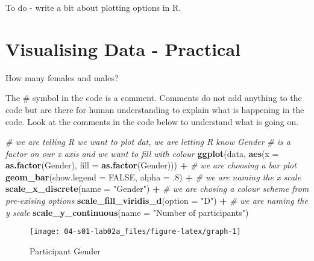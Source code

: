 \documentclass[]{book}
\newenvironment{Shaded}{\begin{snugshade}}{\end{snugshade}}
\newcommand{\CommentTok}[1]{\textcolor[rgb]{0.56,0.35,0.01}{\textit{#1}}}
\newcommand{\DataTypeTok}[1]{\textcolor[rgb]{0.13,0.29,0.53}{#1}}
\newcommand{\FloatTok}[1]{\textcolor[rgb]{0.00,0.00,0.81}{#1}}
\newcommand{\KeywordTok}[1]{\textcolor[rgb]{0.13,0.29,0.53}{\textbf{#1}}}
\newcommand{\NormalTok}[1]{#1}
\newcommand{\OperatorTok}[1]{\textcolor[rgb]{0.81,0.36,0.00}{\textbf{#1}}}
\newcommand{\OtherTok}[1]{\textcolor[rgb]{0.56,0.35,0.01}{#1}}
\newcommand{\StringTok}[1]{\textcolor[rgb]{0.31,0.60,0.02}{#1}}
\begin{document}
To do - write a bit about plotting options in R.

\hypertarget{visualising-data---practical}{%
\section{Visualising Data - Practical}\label{visualising-data---practical}}

How many females and males?

The \# symbol in the code is a comment. Comments do not add anything to the code but are there for human understanding to explain what is happening in the code. Look at the comments in the code below to understand what is going on.

\begin{Shaded}
\begin{Highlighting}[]
\CommentTok{# we are telling R we want to plot dat, we are letting R know Gender }
\CommentTok{# is a factor on our x axis and we want to fill with colour}
\KeywordTok{ggplot}\NormalTok{(data, }\KeywordTok{aes}\NormalTok{(}\DataTypeTok{x =} \KeywordTok{as.factor}\NormalTok{(Gender), }\DataTypeTok{fill =} \KeywordTok{as.factor}\NormalTok{(Gender))) }\OperatorTok{+}
\StringTok{  }\CommentTok{# we are choosing a bar plot}
\StringTok{  }\KeywordTok{geom_bar}\NormalTok{(}\DataTypeTok{show.legend =} \OtherTok{FALSE}\NormalTok{, }\DataTypeTok{alpha =} \FloatTok{.8}\NormalTok{) }\OperatorTok{+}
\StringTok{  }\CommentTok{# we are naming the x scale}
\StringTok{  }\KeywordTok{scale_x_discrete}\NormalTok{(}\DataTypeTok{name =} \StringTok{"Gender"}\NormalTok{) }\OperatorTok{+}
\StringTok{  }\CommentTok{# we are chosing a colour scheme from pre-exising options}
\StringTok{  }\KeywordTok{scale_fill_viridis_d}\NormalTok{(}\DataTypeTok{option =} \StringTok{"D"}\NormalTok{) }\OperatorTok{+}
\StringTok{  }\CommentTok{# we are naming the y scale}
\StringTok{  }\KeywordTok{scale_y_continuous}\NormalTok{(}\DataTypeTok{name =} \StringTok{"Number of participants"}\NormalTok{)}
\end{Highlighting}
\end{Shaded}

\begin{figure}

{\centering \texttt{[image: 04-s01-lab02a\_files/figure-latex/graph-1]} 

}

\caption{Participant Gender}\label{fig:graph}
\end{figure}
\end{document}
